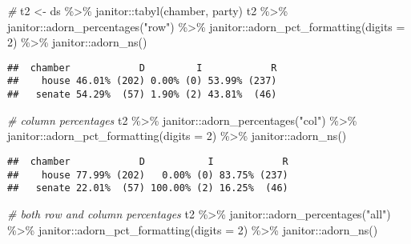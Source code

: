 \documentclass[
]{book}
\newenvironment{Shaded}{\begin{snugshade}}{\end{snugshade}}
\newcommand{\AttributeTok}[1]{\textcolor[rgb]{0.77,0.63,0.00}{#1}}
\newcommand{\CommentTok}[1]{\textcolor[rgb]{0.56,0.35,0.01}{\textit{#1}}}
\newcommand{\DecValTok}[1]{\textcolor[rgb]{0.00,0.00,0.81}{#1}}
\newcommand{\FunctionTok}[1]{\textcolor[rgb]{0.00,0.00,0.00}{#1}}
\newcommand{\NormalTok}[1]{#1}
\newcommand{\OtherTok}[1]{\textcolor[rgb]{0.56,0.35,0.01}{#1}}
\newcommand{\SpecialCharTok}[1]{\textcolor[rgb]{0.00,0.00,0.00}{#1}}
\newcommand{\StringTok}[1]{\textcolor[rgb]{0.31,0.60,0.02}{#1}}
\begin{document}
\begin{Shaded}
\begin{Highlighting}[]
\CommentTok{\#}
\NormalTok{t2 }\OtherTok{\textless{}{-}}\NormalTok{ ds }\SpecialCharTok{\%\textgreater{}\%}\NormalTok{  janitor}\SpecialCharTok{::}\FunctionTok{tabyl}\NormalTok{(chamber, party)}
\NormalTok{t2 }\SpecialCharTok{\%\textgreater{}\%}
\NormalTok{  janitor}\SpecialCharTok{::}\FunctionTok{adorn\_percentages}\NormalTok{(}\StringTok{"row"}\NormalTok{) }\SpecialCharTok{\%\textgreater{}\%}
\NormalTok{  janitor}\SpecialCharTok{::}\FunctionTok{adorn\_pct\_formatting}\NormalTok{(}\AttributeTok{digits =} \DecValTok{2}\NormalTok{) }\SpecialCharTok{\%\textgreater{}\%}
\NormalTok{  janitor}\SpecialCharTok{::}\FunctionTok{adorn\_ns}\NormalTok{()}
\end{Highlighting}
\end{Shaded}

\begin{verbatim}
##  chamber            D         I            R
##    house 46.01% (202) 0.00% (0) 53.99% (237)
##   senate 54.29%  (57) 1.90% (2) 43.81%  (46)
\end{verbatim}

\begin{Shaded}
\begin{Highlighting}[]
\CommentTok{\# column percentages}
\NormalTok{t2 }\SpecialCharTok{\%\textgreater{}\%}
\NormalTok{  janitor}\SpecialCharTok{::}\FunctionTok{adorn\_percentages}\NormalTok{(}\StringTok{"col"}\NormalTok{) }\SpecialCharTok{\%\textgreater{}\%}
\NormalTok{  janitor}\SpecialCharTok{::}\FunctionTok{adorn\_pct\_formatting}\NormalTok{(}\AttributeTok{digits =} \DecValTok{2}\NormalTok{) }\SpecialCharTok{\%\textgreater{}\%}
\NormalTok{  janitor}\SpecialCharTok{::}\FunctionTok{adorn\_ns}\NormalTok{()}
\end{Highlighting}
\end{Shaded}

\begin{verbatim}
##  chamber            D           I            R
##    house 77.99% (202)   0.00% (0) 83.75% (237)
##   senate 22.01%  (57) 100.00% (2) 16.25%  (46)
\end{verbatim}

\begin{Shaded}
\begin{Highlighting}[]
\CommentTok{\# both row and column percentages}
\NormalTok{t2 }\SpecialCharTok{\%\textgreater{}\%}
\NormalTok{  janitor}\SpecialCharTok{::}\FunctionTok{adorn\_percentages}\NormalTok{(}\StringTok{"all"}\NormalTok{) }\SpecialCharTok{\%\textgreater{}\%}
\NormalTok{  janitor}\SpecialCharTok{::}\FunctionTok{adorn\_pct\_formatting}\NormalTok{(}\AttributeTok{digits =} \DecValTok{2}\NormalTok{) }\SpecialCharTok{\%\textgreater{}\%}
\NormalTok{  janitor}\SpecialCharTok{::}\FunctionTok{adorn\_ns}\NormalTok{()}
\end{Highlighting}
\end{Shaded}
\end{document}
